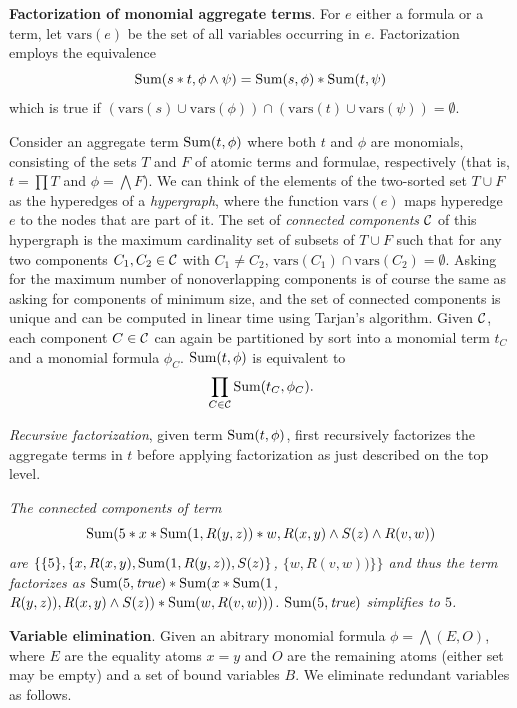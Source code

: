 \def\vars{\mbox{vars}}

{\bf Factorization of monomial aggregate terms}.
For $e$ either a formula or a term, let $\vars(e)$
be the set of all variables occurring in $e$.
Factorization employs the equivalence
\[
\mbox{Sum}(s*t, \phi \land \psi) = \mbox{Sum}(s, \phi) * \mbox{Sum}(t, \psi)
\]
which is true if
$(\vars(s) \cup \vars(\phi)) \cap (\vars(t) \cup \vars(\psi)) = \emptyset$.

Consider an aggregate term $\mbox{Sum}(t, \phi)$ where both $t$ and $\phi$ are
monomials, consisting of the sets $T$ and $F$ of atomic terms and formulae,
respectively (that is, $t = \prod T$ and $\phi = \bigwedge F$).
We can think of the
elements of the two-sorted set $T \cup F$ as the hyperedges of a
{\em hypergraph},
where the function $\vars(e)$ maps hyperedge $e$ to the nodes that are
part of it.
The set of {\em connected components} ${\cal C}$ of this hypergraph is the
maximum cardinality set of subsets of $T \cup F$ such that for any
two components $C_1, C_2 \in {\cal C}$ with $C_1 \neq C_2$,
$\vars(C_1) \cap \vars(C_2) = \emptyset$. Asking for the maximum number of
nonoverlapping components is of course the same as asking for components of
minimum size, and the set of connected components is unique and can be computed
in linear time using Tarjan's algorithm. Given ${\cal C}$, each component
$C \in {\cal C}$ can again be partitioned by sort into a monomial term $t_C$
and a monomial formula $\phi_C$.
%
%
$\mbox{Sum}(t, \phi)$ is equivalent to
\[
\prod_{C \in {\cal C}} \AggSum(t_C, \phi_C).
\]

{\em Recursive factorization}, given term $\mbox{Sum}(t, \phi)$, first recursively
factorizes the aggregate terms in $t$ before applying factorization as
just described on the top level.


\begin{example}\em
The connected components of term
\[
\mbox{Sum}(5 * x * \mbox{Sum}(1, R(y, z)) * w, R(x,y) \land S(z) \land R(v, w))
\]
are
$\{ \{5\}, \{ x, R(x,y), \mbox{Sum}(1, R(y, z)), S(z) \}$,
$\{ w, R(v, w)) \} \}$
and thus the term factorizes as
$\mbox{Sum}(5, \textit{true}) *
\mbox{Sum}(x * \mbox{Sum}(1$, $R(y, z)), R(x, y) \land S(z)) *
\mbox{Sum}(w, R(v, w)))$.
$\mbox{Sum}(5, \textit{true})$ simplifies to $5$.
\punto
\end{example}


{\bf Variable elimination}.
Given an abitrary monomial formula $\phi = \bigwedge (E, O)$,
where $E$ are the equality
atoms $x=y$ and $O$ are the remaining atoms (either set may be empty) and
a set of bound variables $B$.
We eliminate redundant variables as follows.

